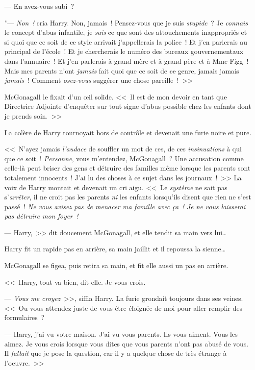 --- En avez-vous subi~?

"--- \emph{Non~!} cria Harry. Non, jamais~! Pensez-vous que je suis \emph{stupide}~? Je \emph{connais} le concept d'abus infantile, je \emph{sais} ce que sont des attouchements inappropriés et si quoi que ce soit de ce style arrivait j'appellerais la police~! Et j'en parlerais au principal de l'école~! Et je chercherais le numéro des bureaux gouvernementaux dans l'annuaire~! Et j'en parlerais à grand-mère et à grand-père et à Mme Figg~! Mais mes parents n'ont \emph{jamais} fait quoi que ce soit de ce genre, jamais jamais \emph{jamais}~! Comment \emph{osez-vous} suggérer une chose pareille~!~>>

McGonagall le fixait d'un œil solide. <<~Il est de mon devoir en tant que Directrice Adjointe d'enquêter sur tout signe d'abus possible chez les enfants dont je prends soin.~>>

La colère de Harry tournoyait hors de contrôle et devenait une furie noire et pure.

<<~N'ayez jamais \emph{l'audace} de souffler un mot de ces, de ces \emph{insinuations} à qui que ce soit~! \emph{Personne}, vous m'entendez, McGonagall~? Une accusation comme celle-là peut briser des gens et détruire des familles même lorsque les parents sont totalement innocents~! J'ai lu des choses à ce sujet dans les journaux~!~>> La voix de Harry montait et devenait un cri aigu. <<~Le \emph{système} ne sait pas s'\emph{arrêter}, il ne croit pas les parents \emph{ni} les enfants lorsqu'ils disent que rien ne s'est passé~! \emph{Ne vous avisez pas de menacer ma famille avec ça~! Je ne vous laisserai pas détruire mon foyer~!}

--- Harry,~>> dit doucement McGonagall, et elle tendit sa main vers lui…

Harry fit un rapide pas en arrière, sa main jaillit et il repoussa la sienne…

McGonagall se figea, puis retira sa main, et fit elle aussi un pas en arrière.

<<~Harry, tout va bien, dit-elle. Je vous crois.

--- \emph{Vous me croyez}~>>, siffla Harry. La furie grondait toujours dans ses veines. <<~Ou vous attendez juste de vous être éloignée de moi pour aller remplir des formulaires~?

--- Harry, j'ai vu votre maison. J'ai vu vous parents. Ils vous aiment. Vous les aimez. Je vous crois lorsque vous dites que vous parents n'ont pas abusé de vous. Il \emph{fallait} que je pose la question, car il y a quelque chose de très étrange à l'oeuvre.~>>

